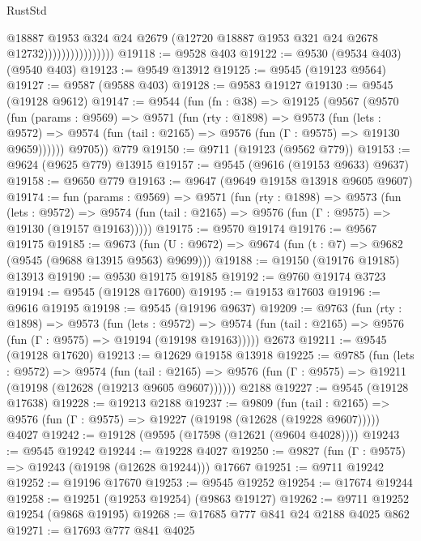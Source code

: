 \begin{lexlean}{RustStd}
\begin{coremodule}
                                  @18887
                                  @1953
                                  @324
                                  @24
                                  @2679
                                  (@12720 @18887 @1953 @321 @24 @2678 @12732))))))))))))))))
@19118 := @9528 @403
@19122 := @9530 (@9534 @403) (@9540 @403)
@19123 := @9549 @13912
@19125 := @9545 (@19123 @9564)
@19127 := @9587 (@9588 @403)
@19128 := @9583 @19127
@19130 := @9545 (@19128 @9612)
@19147 := @9544
    (fun (fn : @38) =>
    @19125
      (@9567
        (@9570
          (fun (params : @9569) =>
          @9571
            (fun (rty : @1898) =>
            @9573
              (fun (lets : @9572) =>
              @9574 (fun (tail : @2165) => @9576 (fun (Γ : @9575) => @19130 @9659))))))
        @9705))
    @779
@19150 := @9711 (@19123 (@9562 @779))
@19153 := @9624 (@9625 @779) @13915
@19157 := @9545 (@9616 (@19153 @9633) @9637)
@19158 := @9650 @779
@19163 := @9647 (@9649 @19158 @13918 @9605 @9607)
@19174 := fun (params : @9569) =>
  @9571
    (fun (rty : @1898) =>
    @9573
      (fun (lets : @9572) =>
      @9574 (fun (tail : @2165) => @9576 (fun (Γ : @9575) => @19130 (@19157 @19163)))))
@19175 := @9570 @19174
@19176 := @9567 @19175
@19185 := @9673
    (fun (U : @9672) => @9674 (fun (t : @7) => @9682 (@9545 (@9688 @13915 @9563) @9699)))
@19188 := @19150 (@19176 @19185) @13913
@19190 := @9530 @19175 @19185
@19192 := @9760 @19174 @3723
@19194 := @9545 (@19128 @17600)
@19195 := @19153 @17603
@19196 := @9616 @19195
@19198 := @9545 (@19196 @9637)
@19209 := @9763
    (fun (rty : @1898) =>
    @9573
      (fun (lets : @9572) =>
      @9574 (fun (tail : @2165) => @9576 (fun (Γ : @9575) => @19194 (@19198 @19163)))))
    @2673
@19211 := @9545 (@19128 @17620)
@19213 := @12629 @19158 @13918
@19225 := @9785
    (fun (lets : @9572) =>
    @9574
      (fun (tail : @2165) =>
      @9576 (fun (Γ : @9575) => @19211 (@19198 (@12628 (@19213 @9605 @9607))))))
    @2188
@19227 := @9545 (@19128 @17638)
@19228 := @19213 @2188
@19237 := @9809
    (fun (tail : @2165) => @9576 (fun (Γ : @9575) => @19227 (@19198 (@12628 (@19228 @9607)))))
    @4027
@19242 := @19128 (@9595 (@17598 (@12621 (@9604 @4028))))
@19243 := @9545 @19242
@19244 := @19228 @4027
@19250 := @9827 (fun (Γ : @9575) => @19243 (@19198 (@12628 @19244))) @17667
@19251 := @9711 @19242
@19252 := @19196 @17670
@19253 := @9545 @19252
@19254 := @17674 @19244
@19258 := @19251 (@19253 @19254) (@9863 @19127)
@19262 := @9711 @19252 @19254 (@9868 @19195)
@19268 := @17685 @777 @841 @24 @2188 @4025 @862
@19271 := @17693 @777 @841 @4025

\end{coremodule}
\end{lexlean}
